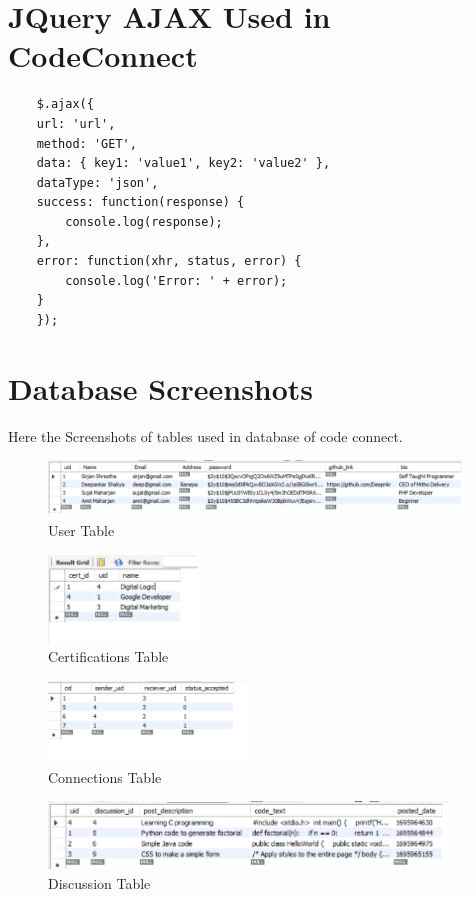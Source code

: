 \section{JQuery AJAX Used in CodeConnect}
\vspace{1cm}
\begin{lstlisting}
    $.ajax({
    url: 'url',
    method: 'GET',
    data: { key1: 'value1', key2: 'value2' },
    dataType: 'json',
    success: function(response) {
        console.log(response);
    },
    error: function(xhr, status, error) {
        console.log('Error: ' + error);
    }
    });

    \end{lstlisting}
    \section{Database Screenshots}
    Here the Screenshots of tables used in database of code connect.
    \begin{figure}[H]
        \centering
            \includegraphics[width=420px]{db_img/user.png}
        \caption{User Table}
    \end{figure}
    \begin{figure}[H]
        \centering
            \includegraphics[width=150px]{db_img/certifications.png}
        \caption{Certifications Table}
    \end{figure}
    \begin{figure}[H]
        \centering
            \includegraphics[width=200px]{db_img/connections.png}
        \caption{Connections Table}
    \end{figure}
    
    \begin{figure}[H]
        \centering
            \includegraphics[width=400px]{db_img/discussion.png}
        \caption{Discussion Table}
    \end{figure}
    
